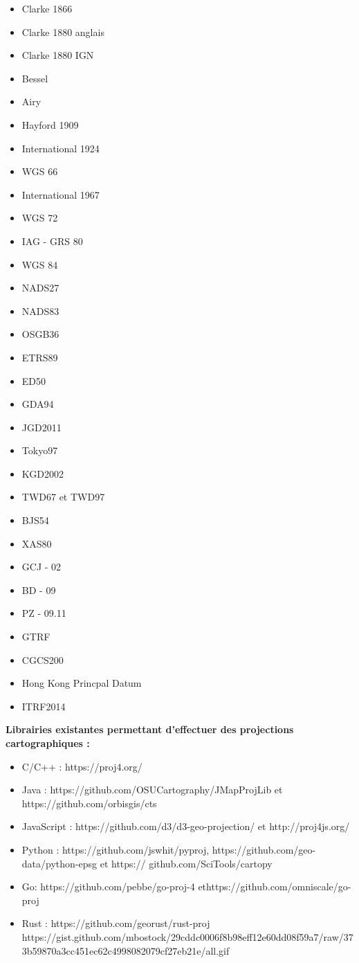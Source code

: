 \documentclass{article}
\begin{document}
\begin{itemize}
    \item Clarke 1866
    \item Clarke 1880 anglais
    \item Clarke 1880 IGN
    \item Bessel
    \item Airy
    \item Hayford 1909
    \item International 1924
    \item WGS 66
    \item International 1967
    \item WGS 72
    \item IAG - GRS 80
    \item WGS 84
    \item NADS27
    \item NADS83
    \item OSGB36
    \item ETRS89
    \item ED50
    \item GDA94
    \item JGD2011
    \item Tokyo97
    \item KGD2002
    \item TWD67 et TWD97
    \item BJS54
    \item XAS80
    \item GCJ - 02
    \item BD - 09
    \item PZ - 09.11
    \item GTRF
    \item CGCS200
    \item Hong Kong Princpal Datum
    \item ITRF2014
\end{itemize}



\textbf{Librairies existantes permettant d'effectuer des projections cartographiques :}

\begin{itemize} 
	\item C/C++ : https://proj4.org/
	\item Java : https://github.com/OSUCartography/JMapProjLib et https://github.com/orbisgis/cts
	\item JavaScript : https://github.com/d3/d3-geo-projection/ et http://proj4js.org/
	\item Python : https://github.com/jswhit/pyproj, https://github.com/geo-data/python-epsg et https://			github.com/SciTools/cartopy
	\item Go: https://github.com/pebbe/go-proj-4 ethttps://github.com/omniscale/go-proj
	\item Rust : https://github.com/georust/rust-proj
https://gist.github.com/mbostock/29cddc0006f8b98eff12e60dd08f59a7/raw/373b59870a3cc451ec62c4998082079cf27eb21e/all.gif
\end{itemize}
\end{document}
